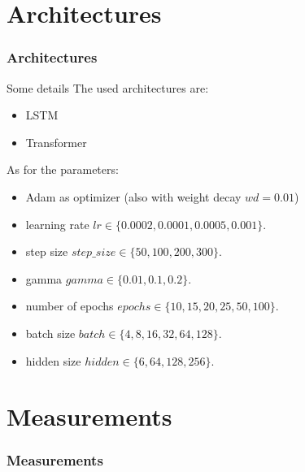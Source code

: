 \documentclass[aspectratio=169,t,xcolor=table]{beamer}
\begin{document}
\section{Architectures}

\begin{frame}{}
    \frametitle{Architectures}
\end{frame}

\begin{frame}{Some details}
    The used architectures are:
    \begin{itemize}
        \item LSTM \cite{yu2019review}
        \item Transformer \cite{vaswani2017attention}
    \end{itemize}
    As for the parameters:
    \begin{itemize}
        \item Adam as optimizer (also with weight decay $wd=0.01$)
        \item learning rate $lr \in \{0.0002,0.0001,0.0005,0.001\}$.
        \item step size $step\_size \in \{50,100,200,300\}$.
        \item gamma $gamma \in \{0.01,0.1,0.2\}$.
        \item number of epochs $epochs \in \{10,15,20,25,50,100\}$.
        \item batch size $batch \in \{4,8,16,32,64,128\}$.
        \item hidden size $hidden \in \{6,64,128,256\}$.
    \end{itemize}  
\end{frame}

\section{Measurements}

\begin{frame}{}
    \frametitle{Measurements}
\end{frame}
\end{document}
